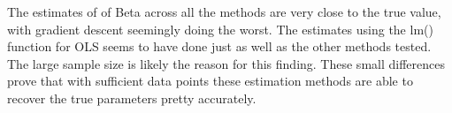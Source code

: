 \documentclass[12pt,letterpaper]{article}
\begin{document}
The estimates of of Beta across all the methods are very close to the true value, with gradient descent seemingly doing the worst. The estimates using the lm() function for OLS seems to have done just as well as the other methods tested. The large sample size is likely the reason for this finding. These small differences prove that with sufficient data points these estimation methods are able to recover the true parameters pretty accurately. 
\end{document}
